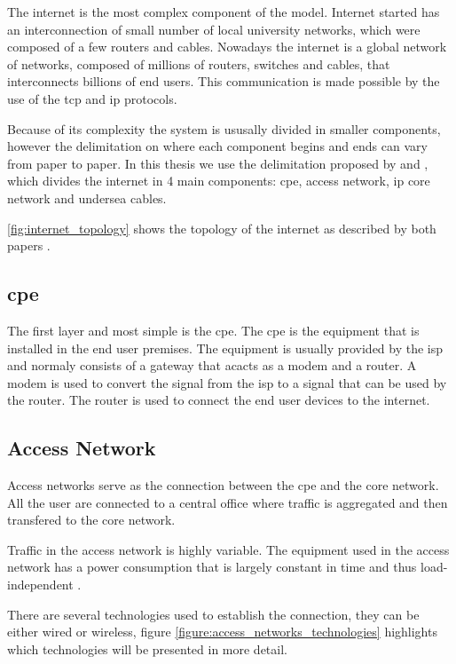 The internet is the most complex component of the model.
Internet started has an interconnection of small number of local university networks, which were composed of a few routers and cables. Nowadays the internet is a global network of networks, composed of millions of routers, switches and cables, that interconnects billions of end users. This communication is made possible by the use of the \ac{tcp} and \ac{ip} protocols.

Because of its complexity the system is ususally divided in smaller components, however the delimitation on where each component begins and ends can vary from paper to paper. In this thesis we use the delimitation proposed by \citet{Coroama2015} and \citet{Schien2015}, which divides the internet in 4 main components: \ac{cpe}, access network, \ac{ip} core network and undersea cables.

\ref{fig:internet_topology} shows the topology of the internet as described by both papers \cite{Coroama2015} \cite{Schien2015}. 

\subsection{\acl{cpe}}

The first layer and most simple is the \ac{cpe}. The \ac{cpe} is the equipment that is installed in the end user premises. 
The equipment is usually provided by the \ac{isp} and normaly consists of a gateway that acacts as a modem and a router.
A modem is used to convert the signal from the \ac{isp} to a signal that can be used by the router. The router is used to connect the end user devices to the internet.

\subsection{Access Network}

Access networks serve as the connection between the \ac{cpe} and the core network. All the user are connected to a central office where traffic is aggregated and then transfered to the core network.

Traffic in the access network is highly variable. The equipment used in the access network has a power consumption that is largely constant in time and thus load-independent \citet{Heddeghem2011}.

There are several technologies used to establish the connection, they can be either wired or wireless, figure \ref{figure:access_networks_technologies} highlights which technologies will be presented in more detail.

